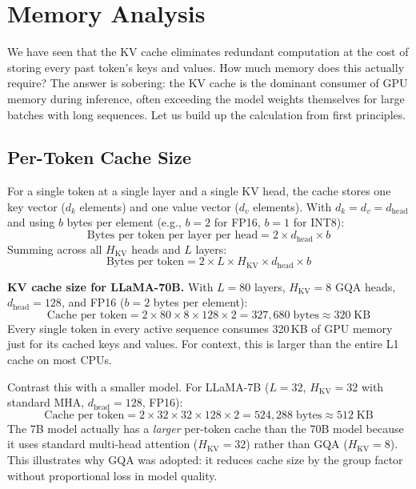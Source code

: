 \section{Memory Analysis}
\label{sec:kvcache:memory}

We have seen that the KV cache eliminates redundant computation at the cost of storing every past token's keys and values. How much memory does this actually require? The answer is sobering: the KV cache is the dominant consumer of GPU memory during inference, often exceeding the model weights themselves for large batches with long sequences. Let us build up the calculation from first principles.

\subsection{Per-Token Cache Size}

For a single token at a single layer and a single KV head, the cache stores one key vector ($d_k$ elements) and one value vector ($d_v$ elements). With $d_k = d_v = d_{\text{head}}$ and using $b$ bytes per element (e.g., $b = 2$ for FP16, $b = 1$ for INT8):
\begin{equation}
\label{eq:per-token-per-layer-per-head}
\text{Bytes per token per layer per head} = 2 \times d_{\text{head}} \times b
\end{equation}
Summing across all $H_{\text{KV}}$ heads and $L$ layers:
\begin{equation}
\label{eq:per-token}
\text{Bytes per token} = 2 \times L \times H_{\text{KV}} \times d_{\text{head}} \times b
\end{equation}

\begin{notebox}
\textbf{KV cache size for LLaMA-70B.} With $L = 80$ layers, $H_{\text{KV}} = 8$ GQA heads, $d_{\text{head}} = 128$, and FP16 ($b = 2$ bytes per element):
\[
\text{Cache per token} = 2 \times 80 \times 8 \times 128 \times 2 = 327{,}680\;\text{bytes} \approx 320\;\text{KB}
\]
Every single token in every active sequence consumes 320\,KB of GPU memory just for its cached keys and values. For context, this is larger than the entire L1 cache on most CPUs.
\end{notebox}

Contrast this with a smaller model. For LLaMA-7B ($L = 32$, $H_{\text{KV}} = 32$ with standard MHA, $d_{\text{head}} = 128$, FP16):
\[
\text{Cache per token} = 2 \times 32 \times 32 \times 128 \times 2 = 524{,}288\;\text{bytes} \approx 512\;\text{KB}
\]
The 7B model actually has a \emph{larger} per-token cache than the 70B model because it uses standard multi-head attention ($H_{\text{KV}} = 32$) rather than GQA ($H_{\text{KV}} = 8$). This illustrates why GQA was adopted: it reduces cache size by the group factor without proportional loss in model quality.

